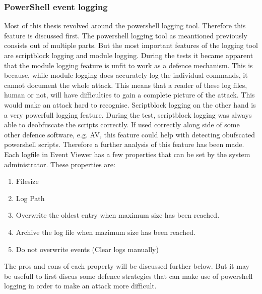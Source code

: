 \documentclass{article}%
\begin{document}
\subsubsection{PowerShell event logging}
Most of this thesis revolved around the powershell logging tool. Therefore this feature is discussed first. The powershell logging tool as meantioned previously consists out of multiple parts. But the most important features of the logging tool are scriptblock logging and module logging. During the tests it became apparent that the module logging feature is unfit to work as a defence mechanism. This is because, while module logging does accurately log the individual commands, it cannot document the whole attack. This means that a reader of these log files, human or not, will have difficulties to gain a complete picture of the attack. This would make an attack hard to recognise. Scriptblock logging on the other hand is a very powerfull logging feature. During the test, scriptblock logging was always able to deobfuscate the scripts correctly. If used correctly along side of some other defence software, e.g. AV, this feature could help with detecting obufscated powershell scripts. Therefore a further analysis of this feature has been made.
Each logfile in Event Viewer has a few properties that can be set by the system administrator. These properties are:
\begin{enumerate}
	\item Filesize
	\item Log Path
	\item Overwrite the oldest entry when maximum size has been reached.
	\item Archive the log file when mazimum size has been reached.
	\item Do not overwrite events (Clear logs manually)
\end{enumerate}
The pros and cons of each property will be discussed further below. But it may be usefull to first discus some defence strategies that can make use of powershell logging in order to make an attack more difficult.
\end{document}
